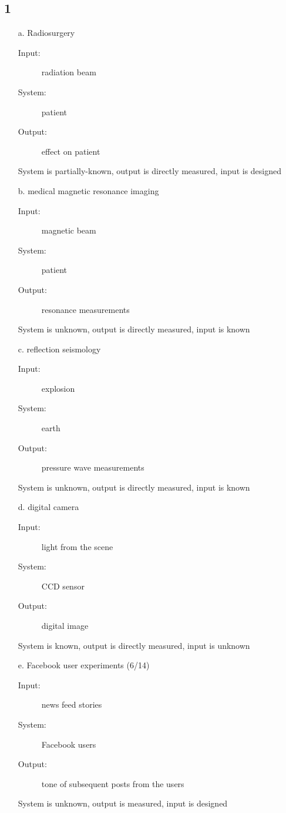\documentclass[10pt, letterpaper]{article}
\begin{document}
\subsection*{1}
\begin{enumerate}
\item[a.] Radiosurgery

\begin{description}
    \item[Input:] radiation beam
    \item[System:] patient
    \item[Output:] effect on patient
\end{description}

System is partially-known, output is directly measured, input is designed


\item[b.] medical magnetic resonance imaging

\begin{description}
    \item[Input:] magnetic beam
    \item[System:] patient
    \item[Output:] resonance measurements
\end{description}

System is unknown, output is directly measured, input is known

\item[c.] reflection seismology

\begin{description}
    \item[Input:] explosion
    \item[System:] earth
    \item[Output:] pressure wave measurements
\end{description}

System is unknown, output is directly measured, input is known

\item[d.] digital camera

\begin{description}
    \item[Input:] light from the scene
    \item[System:] CCD sensor
    \item[Output:] digital image
\end{description}

System is known, output is directly measured, input is unknown

\item[e.] Facebook user experiments (6/14)

\begin{description}
    \item[Input:] news feed stories
    \item[System:] Facebook users
    \item[Output:] tone of subsequent posts from the users
\end{description}

System is unknown, output is measured, input is designed
\end{enumerate}
\end{document}
